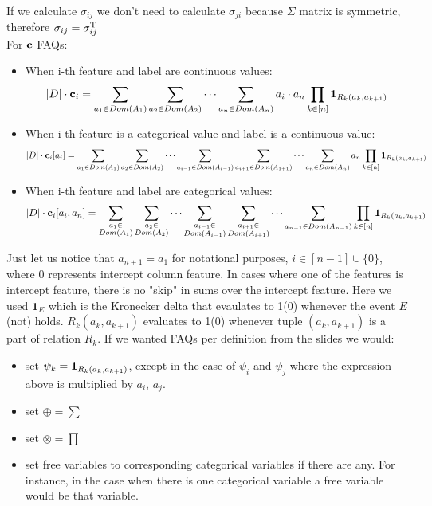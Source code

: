 \documentclass[10pt,a4paper]{article}
\begin{document}
\begin{enumerate}
\begin{itemize}
\end{itemize}
If we calculate $\sigma_{ij}$ we don't need to calculate $\sigma_{ji}$ because $\Sigma$ matrix is symmetric, therefore $\sigma_{ij} =\sigma_{ij} ^ \text{T}$ \\
For $\textbf{\text{{c}}}$ FAQs:
\begin{itemize}
\item When i-th feature and label are  continuous values: 
$$|D| \cdot \mathbf{c}_{i}= \sum_{a_1 \in Dom(A_1)} \sum_{a_2 \in Dom(A_2)} \cdots \sum_{a_n \in Dom(A_n)} a_i \cdot a_n 
\prod_{k\in[n]} \textbf{\text{{1}}}_{R_k(a_k, a_{k+1})}$$
\item When i-th feature is a categorical value and label is a continuous value: 
$$|D| \cdot \mathbf{c}_{i}[a_i]= \sum_{a_1 \in Dom(A_1)} \sum_{a_2 \in Dom(A_2)} \cdots 
\sum_{a_{i-1} \in Dom(A_{i-1})}
\sum_{a_{i+1} \in Dom(A_{1+1})}
\cdots
\sum_{a_n \in Dom(A_n)}  a_n 
\prod_{k\in[n]} \textbf{\text{{1}}}_{R_k(a_k, a_{k+1})}$$
\item When i-th feature and label are categorical values: 
$$|D| \cdot \mathbf{c}_{i}[a_i, a_n]= 
\sum_{\substack{a_{1} \in \\Dom(A_{1})}}
\sum_{\substack{a_{2} \in \\Dom(A_{2})}}
\cdots 
\sum_{\substack{a_{i-1} \in \\Dom(A_{i-1})}}
\sum_{\substack{a_{i+1} \in \\Dom(A_{i+1})}}
\cdots
\sum_{a_{n-1} \in Dom(A_{n-1})}  
\prod_{k\in[n]} \textbf{\text{{1}}}_{R_k(a_k, a_{k+1})}$$
\end{itemize}
Just let us notice that $a_{n+1}=a_1$ for notational purposes, $i \in [n-1] \cup \{0\} $, where $0$ represents intercept column feature. In cases where one of the features is intercept feature, there is no "skip" in sums over the intercept feature.
Here we used $\mathbf{1}_E$ which is the Kronecker delta that evaulates to 1(0) whenever the event $E$ (not) holds. $R_k(a_k, a_{k+1})$ evaluates to 1(0) whenever tuple $(a_k, a_{k+1})$ is a part of relation $R_k$. 
If we wanted FAQs per definition from the slides we would:
\begin{itemize}
\item set $\psi_k=\textbf{\text{{1}}}_{R_k(a_k, a_{k+1})}$, except in the case of $\psi_{i}$ and $\psi_j$ where the expression above is multiplied by $a_i$, $a_j$.
\item set $\oplus = \sum$
\item set $\otimes = \prod$
\item set free variables to corresponding categorical variables if there are any. For instance, in the case when there is one categorical variable a free variable would be that variable. 

\end{itemize}
\end{enumerate}
\end{document}
